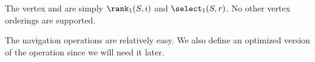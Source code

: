 \begin{algorithm}
\begin{algorithmic}
	\State {}
\EndFunction
\end{algorithmic}
\end{algorithm}

The vertex \inRank{} and \inSelect{} are simply $\rank_1(S, i)$ and $\select_1(S, r)$.
No other vertex orderings are supported.

The navigation operations are relatively easy.
We also define an optimized version of the operation \childLast since we will need it later.

\begin{algorithm}
\begin{algorithmic}
	\State {}
\EndFunction
\end{algorithmic}
\end{algorithm}

\begin{algorithm}
\begin{algorithmic}
	\State {} 
\EndFunction
\end{algorithmic}
\end{algorithm}

\begin{algorithm}
\begin{algorithmic}
	\State {} 
\EndFunction
\end{algorithmic}
\end{algorithm}

\begin{algorithm}
\begin{algorithmic}
	\State {} 
\EndFunction
\end{algorithmic}
\end{algorithm}

\begin{algorithm}
\begin{algorithmic}
	\State {} 
\EndFunction
\end{algorithmic}
\end{algorithm}

